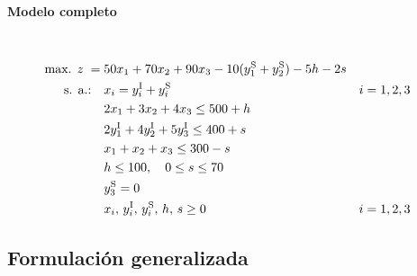 \paragraph{Modelo completo}\mbox{}\\
\begin{align}
\mbox{max. } z \;=\;& 50x_1 + 70x_2 + 90x_3 - 10(y_1^{\mathrm{S}}+y_2^{\mathrm{S}}) - 5h - 2s \notag\\
\mbox{s. a.:}\quad
& x_i = y_i^{\mathrm{I}} + y_i^{\mathrm{S}} && i=1,2,3 \notag\\
& 2x_1 + 3x_2 + 4x_3 \leq 500 + h \notag\\
& 2y_1^{\mathrm{I}} + 4y_2^{\mathrm{I}} + 5y_3^{\mathrm{I}} \leq 400 + s \notag\\
& x_1 + x_2 + x_3 \leq 300 - s \notag\\
& h \leq 100,\quad 0 \leq s \leq 70 \notag\\
& y_3^{\mathrm{S}} = 0 \notag\\
& x_i,\, y_i^{\mathrm{I}},\, y_i^{\mathrm{S}},\, h,\, s \geq 0 && i=1,2,3 \notag
\end{align}


\subsection{Formulación generalizada}


